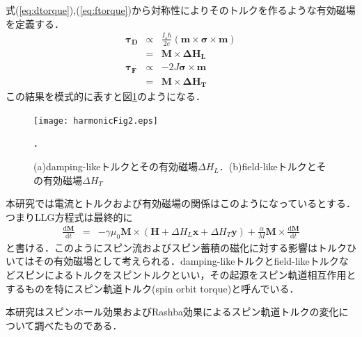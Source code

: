 式(\ref{eq:dtorque}),(\ref{eq:ftorque})から対称性によりそのトルクを作るような有効磁場を定義する\cite{yang2015layer}．
\begin{eqnarray}
\bm{\tau_{D}} &\propto& \frac{I_{s}\hbar}{2e}(\bm{m}\times\bm{\sigma}\times\bm{m})\nonumber\\
&=&\bm{M}\times\bm{\Delta H_{L}}\\
\bm{\tau_{F}} &\propto&-2J\bm{\sigma}\times\bm{m}\nonumber\\
&=&\bm{M}\times\bm{\Delta H_{T}}
\label{eq:dftorque}
\end{eqnarray}
この結果を模式的に表すと図\ref{harmonicFig2}のようになる．
\begin{figure}[!h]
 \begin{center}
  \texttt{[image: harmonicFig2.eps]}
\end{center}
 \caption{(a)damping-likeトルクとその有効磁場$\Delta H_{L}$．(b)field-likeトルクとその有効磁場$\Delta H_{T}$}．
 \label{harmonicFig2}
\end{figure}
本研究では電流とトルクおよび有効磁場の関係はこのようになっているとする．
つまりLLG方程式は最終的に
\begin{eqnarray}
\frac{\mathrm{d}\bm{M}}{\mathrm{d}t}&=&-\gamma\mu_{0}\bm{M}\times\left(\bm{H}+\Delta H_{L}\bm{x}+\Delta H_{T}\bm{y}\right)+\frac{\alpha}{M}\bm{M}\times\frac{\mathrm{d}\bm{M}}{\mathrm{d}t}
\label{eq:LLGeq4}
\end{eqnarray}
と書ける\cite{hayashi2014quantitative}．このようにスピン流およびスピン蓄積の磁化に対する影響はトルクひいてはその有効磁場として考えられる．damping-likeトルクとfield-likeトルクなどスピンによるトルクをスピントルクといい，その起源をスピン軌道相互作用とするものを特にスピン軌道トルク(spin orbit torque)と呼んでいる．






本研究はスピンホール効果およびRashba効果によるスピン軌道トルクの変化について調べたものである．

